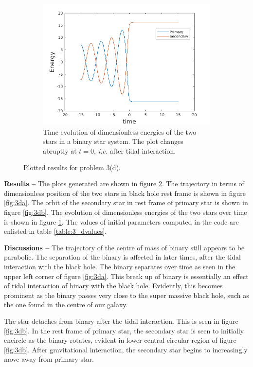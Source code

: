 \documentclass[a4paper]{article}
\begin{document}
\begin{enumerate} [label*=\textbf{(\alph*)}]
\begin{figure} [h]
						\begin{subfigure} {\columnwidth}
							\centering
							\includegraphics[width=.5\columnwidth]{../plots/3d_energy.png}
							\caption{Time evolution of dimensionless energies of the two stars in a binary star system. The plot changes abruptly at \(t=0\), \textit{i.e.} after tidal interaction.}
							\label{fig:3dc}
						\end{subfigure}
						\caption{Plotted results for problem 3(d).}
						\label{fig:3.2}
					\end{figure}
					
					\subitem \textbf{Results  --} 
					The plots generated are shown in figure \ref{fig:3.2}. The trajectory in terms of dimensionless position of the two stars in black hole rest frame is shown in figure \ref{fig:3da}. The orbit of the secondary star in rest frame of primary star is shown in figure \ref{fig:3db}. The evolution of dimensionless energies of the two stars over time is shown in figure \ref{fig:3dc}. The values of initial parameters computed in the code are enlisted in table \ref{table:3_dvalues}.
					
					\subitem \textbf{Discussions  --}
					The trajectory of the centre of mass of binary still appears to be parabolic. The separation of the binary is affected in later times, after the tidal interaction with the black hole. The binary separates over time as seen in the upper left corner of figure \ref{fig:3da}. This break up of binary is essentially an effect of tidal interaction of binary with the black hole. Evidently, this becomes prominent as the binary passes very close to the super massive black hole, such as the one found in the centre of our galaxy.
					
					The star detaches from binary after the tidal interaction. This is seen in figure \ref{fig:3db}. In the rest frame of primary star, the secondary star is seen to initially encircle as the binary rotates, evident in lower central circular region of figure \ref{fig:3db}. After gravitational interaction, the secondary star begins to increasingly move away from primary star.
					

\end{enumerate}
\end{document}
